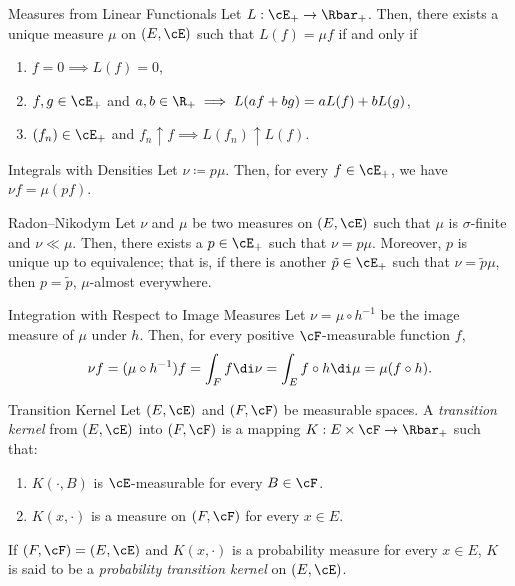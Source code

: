 \begin{thm}{Measures from Linear Functionals}{}
	Let \(L : \cE_+ \to \Rbar_+\). Then, there exists a unique measure \(\mu\) on \((E, \cE)\) such that \(L(f) = \mu f\) if and only if
	\begin{enumerate}
		\item \(f = 0 \implies L(f) = 0\),
		\item \(f, g \in \cE_+\) and \(a, b \in \R_+ \implies L(af + bg) = aL(f) + bL(g)\),
		\item \((f_n) \in \cE_+\) and \(f_n \uparrow f \implies L(f_n) \uparrow L(f)\).
	\end{enumerate}
\end{thm}

\begin{thm}{Integrals with Densities}{}
	Let \(\nu \coloneqq p \mu\). Then, for every \(f \in \cE_+\), we have \(\nu f = \mu(pf)\).
\end{thm}

\begin{thm}{Radon--Nikodym}{}
	Let \(\nu\) and \(\mu\) be two measures on \((E, \cE)\) such that \(\mu\) is \(\sigma\)-finite and \(\nu \ll \mu\). Then, there exists a \(p \in \cE_+\) such that \(\nu = p \mu\). Moreover, \(p\) is unique up to equivalence; that is, if there is another \(\tilde{p} \in \cE_+\) such that \(\nu = \tilde{p} \mu\), then \(p = \tilde{p}\), \(\mu\)-almost everywhere.
\end{thm}

\begin{thm}{Integration with Respect to Image Measures}{}
	Let \(\nu = \mu \circ h^{-1}\) be the image measure of \(\mu\) under \(h\). Then, for every positive \(\cF\)-measurable function \(f\),
	\begin{equation*}
		\nu f = (\mu \circ h^{-1}) f = \int_F f \di \nu = \int_E f \circ h \di \mu = \mu(f \circ h).
	\end{equation*}
\end{thm}

\begin{defn}{Transition Kernel}{}
	Let \((E, \cE)\) and \((F, \cF)\) be measurable spaces. A \textit{transition kernel} from \((E, \cE)\) into \((F, \cF)\) is a mapping \(K : E \times \cF \to \Rbar_+\) such that:
	\begin{enumerate}
		\item \(K(\cdot, B)\) is \(\cE\)-measurable for every \(B \in \cF\).
		\item \(K(x, \cdot)\) is a measure on \((F, \cF)\) for every \(x \in E\).
	\end{enumerate}
	If \((F, \cF) = (E, \cE)\) and \(K(x, \cdot)\) is a probability measure for every \(x \in E\), \(K\) is said to be a \textit{probability transition kernel} on \((E, \cE)\).
\end{defn}

